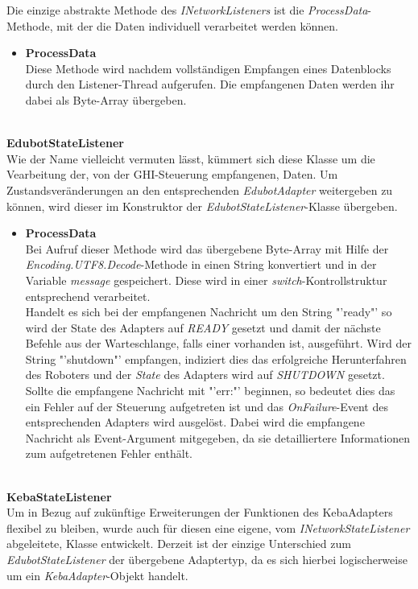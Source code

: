 Die einzige abstrakte Methode des  \textit{INetworkListeners} ist die \textit{ProcessData}-Methode, mit der die Daten individuell verarbeitet werden können.
\begin{itemize}
\item \textbf{ProcessData}\\
Diese Methode wird nachdem vollständigen Empfangen eines Datenblocks durch den Listener-Thread aufgerufen. Die empfangenen Daten werden ihr dabei als Byte-Array übergeben.
\end{itemize}
\\[0.5em]
\textbf{EdubotStateListener}\\
Wie der Name vielleicht vermuten lässt, kümmert sich diese Klasse um die Vearbeitung der, von der GHI-Steuerung empfangenen, Daten. Um Zustandsveränderungen an den entsprechenden \textit{EdubotAdapter} weitergeben zu können, wird dieser im Konstruktor der \textit{EdubotStateListener}-Klasse übergeben.
\begin{itemize}
\item \textbf{ProcessData}\\
Bei Aufruf dieser Methode wird das übergebene Byte-Array mit Hilfe der \textit{Encoding.UTF8.Decode}-Methode in einen String konvertiert und in der Variable \textit{message} gespeichert. Diese wird in einer  \textit{switch}-Kontrollstruktur entsprechend verarbeitet.\\
Handelt es sich bei der empfangenen Nachricht um den String "'ready"' so wird der State des Adapters auf \textit{READY} gesetzt und damit der nächste Befehle aus der Warteschlange, falls einer vorhanden ist, ausgeführt.
Wird der String "'shutdown"' empfangen, indiziert dies das erfolgreiche Herunterfahren des Roboters und der \textit{State} des Adapters wird auf \textit{SHUTDOWN} gesetzt. Sollte die empfangene Nachricht mit "'err:"' beginnen, so bedeutet dies das ein Fehler auf der Steuerung aufgetreten ist und das \textit{OnFailure}-Event des entsprechenden Adapters wird ausgelöst. Dabei wird die empfangene Nachricht als Event-Argument mitgegeben, da sie detailliertere Informationen zum aufgetretenen Fehler enthält.
\end{itemize}
\\[0.5em]
\textbf{KebaStateListener}\\
Um in Bezug auf zukünftige Erweiterungen der Funktionen des KebaAdapters flexibel zu bleiben, wurde auch für diesen eine eigene, vom  \textit{INetworkStateListener} abgeleitete, Klasse entwickelt. Derzeit ist der einzige Unterschied zum  \textit{EdubotStateListener} der übergebene Adaptertyp, da es sich hierbei logischerweise um ein  \textit{KebaAdapter}-Objekt handelt.
